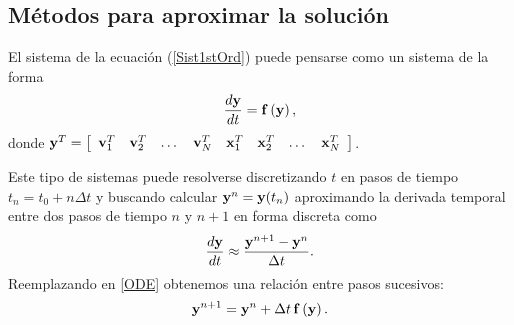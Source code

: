 \subsection*{Métodos para aproximar la solución}

El sistema de la ecuación (\ref{Sist1stOrd}) puede pensarse como un sistema de la forma
\begin{equation} \label{ODE}
 \frac{d{\bf y}}{dt} = {\bf f}\left({\bf y}\right), %
\end{equation}
donde ${\bf y}^T = \left[
\begin{array}{cccccccc}
{\bf v}_1^T & {\bf v}_2^T & \dots & {\bf v}_N^T & {\bf x}_1^T & {\bf x}_2^T & \dots & {\bf x}_N^T
\end{array}
\right]$.

Este tipo de sistemas puede resolverse discretizando $t$ en pasos de tiempo $t_n=t_0+n\Delta t$ y buscando calcular ${\bf y}^n = {\bf y}(t_n)$ aproximando la derivada temporal entre dos pasos de tiempo $n$ y $n+1$ en forma discreta como 
\begin{equation*}
 \frac{d{\bf y}}{dt} \approx \frac{{\bf y}^{n+1} - {\bf y}^n}{\Delta t}.
\end{equation*}
Reemplazando en \eqref{ODE} obtenemos una relación entre pasos sucesivos:
\begin{equation}
 {\bf y}^{n+1} = {\bf y}^n + \Delta t \, {\bf f}\left({\bf y}\right).
 \label{SolucTemp}
\end{equation}

